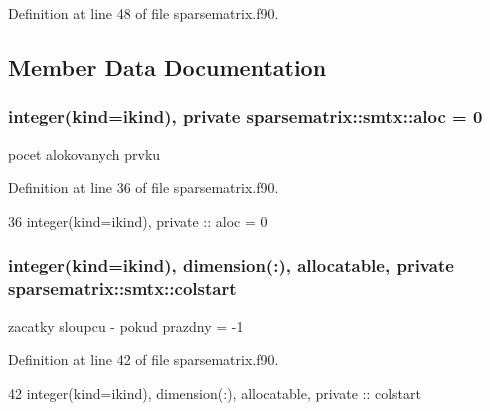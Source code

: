 Definition at line 48 of file sparsematrix.\+f90.



\subsection{Member Data Documentation}
\subsubsection[{aloc}]{\setlength{\rightskip}{0pt plus 5cm}integer(kind=ikind), private sparsematrix\+::smtx\+::aloc = 0\hspace{0.3cm}{\ttfamily [private]}}\label{structsparsematrix_1_1smtx_a43eef4c434ec3d060bd32d8f5745b500}


pocet alokovanych prvku 



Definition at line 36 of file sparsematrix.\+f90.


\begin{DoxyCode}
36         \textcolor{keywordtype}{integer(kind=ikind)}, \textcolor{keywordtype}{private} :: aloc = 0
\end{DoxyCode}
\subsubsection[{colstart}]{\setlength{\rightskip}{0pt plus 5cm}integer(kind=ikind), dimension(\+:), allocatable, private sparsematrix\+::smtx\+::colstart\hspace{0.3cm}{\ttfamily [private]}}\label{structsparsematrix_1_1smtx_a7ea7f26c64b66583a62d6b10094708e3}


zacatky sloupcu -\/ pokud prazdny = -\/1 



Definition at line 42 of file sparsematrix.\+f90.


\begin{DoxyCode}
42         \textcolor{keywordtype}{integer(kind=ikind)}, \textcolor{keywordtype}{dimension(:)}, \textcolor{keywordtype}{allocatable}, \textcolor{keywordtype}{private} :: colstart
\end{DoxyCode}
